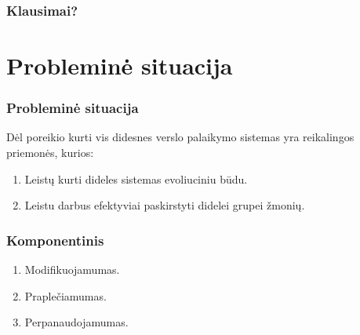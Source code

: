 \begin{frame}
  \frametitle{Klausimai?}
\end{frame}

\section{Probleminė situacija}


\begin{frame}
  \frametitle{Probleminė situacija}
  Dėl poreikio kurti vis didesnes verslo palaikymo sistemas yra
  reikalingos priemonės, kurios:
  \begin{enumerate}
    \item Leistų kurti dideles sistemas evoliuciniu būdu.
    \item Leistu darbus efektyviai paskirstyti didelei grupei
      žmonių.
  \end{enumerate}
  \begin{comment}
    Kadangi verslo palaikymo sistemos perima vis daugiau verslo
    funkcijų, tai jos tampa vis didesnės ir todėl didėja poreikis
    turėti priemones, kurios:
    \begin{enumerate}
      \item Leistų kurti dideles sistemas evoliuciniu būdu, kas
        idealiu atveju būtų, kad papildant sistemą naujomis funkcijomis
        nereikia lįsti prie jau esamų realizacijos.
      \item Leistų sistemų kūrimo darbus efektyviai paskirstyti didelei
        grupei žmonių.
    \end{enumerate}
  \end{comment}
\end{frame}

\begin{frame}
  \frametitle{Komponentinis}
  \begin{enumerate}
    \item Modifikuojamumas.
    \item Praplečiamumas.
    \item Perpanaudojamumas.
  \end{enumerate}
  \begin{comment}
    Clemens Szyperski bei keleto kitų autorių teigimu sistemas kuriant
    komponentiškai, jos būtų lengviau modifikuojamos ir praplečiamos
    bei dėl to, kad komponentus nekeičiant galima naudoti keliose
    sistemose, didėja perpanaudojamumas.
  \end{comment}
\end{frame}

